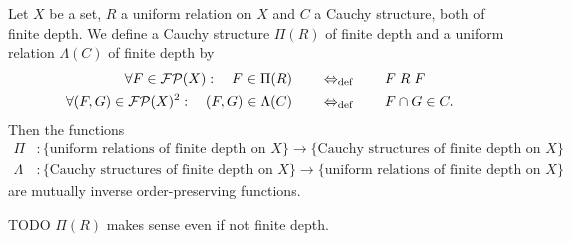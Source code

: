 \begin{proposition}
Let $X$ be a set, $R$ a uniform relation on $X$ and $C$ a Cauchy structure, both of finite depth. We define a Cauchy structure $\Pi(R)$ of finite depth and a uniform relation $\Lambda(C)$ of finite depth by
\begin{align*}
\forall F \in \operatorname{\mathcal{FP}}(X): \quad F\in \Pi(R) \quad &\quad\Leftrightarrow_{\text{def}}\quad \quad F\mathrel{R}F \; \\
\forall (F,G)\in \operatorname{\mathcal{FP}}(X)^2: \quad (F,G)\in \Lambda(C) \quad & \quad\Leftrightarrow_{\text{def}}\quad \quad F\cap G \in C.
\end{align*}
Then the functions
\begin{align*}
\Pi &: \{\text{uniform relations of finite depth on $X$}\} \to \{\text{Cauchy structures of finite depth on $X$}\} \\
\Lambda &: \{\text{Cauchy structures of finite depth on $X$}\} \to \{\text{uniform relations of finite depth on $X$}\}
\end{align*}
are mutually inverse order-preserving functions.
\end{proposition}
TODO $\Pi(R)$ makes sense even if not finite depth.
